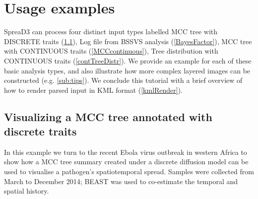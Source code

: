\documentclass[english]{paper}
\def \spreadname {SpreaD3}
\begin{document}
\section{Usage examples}

{\spreadname} can process four distinct input types labelled MCC tree with DISCRETE traits (\ref{discrete}), Log file from BSSVS analysis (\ref{BayesFactor}), MCC tree with CONTINUOUS traits (\ref{MCCcontinuous}), Tree distribution with CONTINUOUS traits (\ref{contTreeDistr}). 
We provide an example for each of these basic analysis types, and also illustrate how more complex layered images can be constructed (e.g. \ref{sub:tips}). 
We conclude this tutorial with a brief overview of how to render parsed input in KML format (\ref{kmlRender}).

\subsection{Visualizing a MCC tree annotated with discrete traits}
\label{discrete}
In this example we turn to the recent Ebola virus outbreak in western Africa to show how a MCC tree summary created under a discrete diffusion model \citep{lemey:2009fk} can be used to visualise a pathogen's spatiotemporal spread. 
Samples were collected from March to December 2014; BEAST \citep{drummond:2012zr} was used to co-estimate the temporal and spatial history. 
\end{document}
